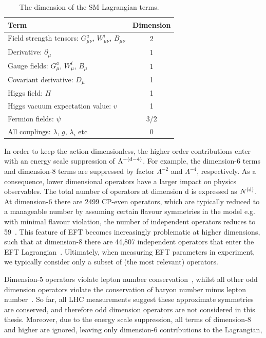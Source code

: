 \begin{table}[htb]
    \caption[Dimension of the SM Lagrangian terms]{The dimension of the SM Lagrangian terms.}
    \label{tab:dimension}
    \centering
    \footnotesize
    \setlength{\tabcolsep}{8pt}
    \renewcommand{\arraystretch}{1.2}
    \begin{tabular}{l|c}
        Term & Dimension \\ \hline
        Field strength tensors: $G^a_{\mu\nu}$, $W^i_{\mu\nu}$, $B_{\mu\nu}$ & 2 \\
        Derivative: $\partial_\mu$ & 1 \\
        Gauge fields: $G^a_\mu$, $W^i_\mu$, $B_\mu$ & 1 \\
        Covariant derivative: $D_\mu$ & 1 \\
        Higgs field: $H$ & 1 \\
        Higgs vacuum expectation value: $v$ & 1 \\
        Fermion fields: $\psi$ & 3/2 \\
        All couplings: $\lambda$, $g$, $\lambda_i$ etc & 0 \\
    \end{tabular}
\end{table}

In order to keep the action dimensionless, the higher order contributions enter with an energy scale suppression of $\Lambda^{-({\rm{d}}-4)}$. For example, the dimension-6 terms and dimension-8 terms are suppressed by factor $\Lambda^{-2}$ and $\Lambda^{-4}$, respectively. As a consequence, lower dimensional operators have a larger impact on physics observables. The total number of operators at dimension d is expressed as $N^{\rm{(d)}}$. At dimension-6 there are 2499 CP-even operators, which are typically reduced to a manageable number by assuming certain flavour symmetries in the model e.g. with minimal flavour violation, the number of independent operators reduces to 59~\cite{Alonso:2013hga}. This feature of EFT becomes increasingly problematic at higher dimensions, such that at dimension-8 there are 44,807 independent operators that enter the EFT Lagrangian~\cite{Murphy:2020rsh}. Ultimately, when measuring EFT parameters in experiment, we typically consider only a subset of (the most relevant) operators.

Dimension-5 operators violate lepton number conservation~\cite{Weinberg:1979sa}, whilst all other odd dimension operators violate the conservation of baryon number minus lepton number~\cite{deGouvea:2014lva}. So far, all LHC measurements suggest these approximate symmetries are conserved, and therefore odd dimension operators are not considered in this thesis. Moreover, due to the energy scale suppression, all terms of dimension-8 and higher are ignored, leaving only dimension-6 contributions to the Lagrangian,

